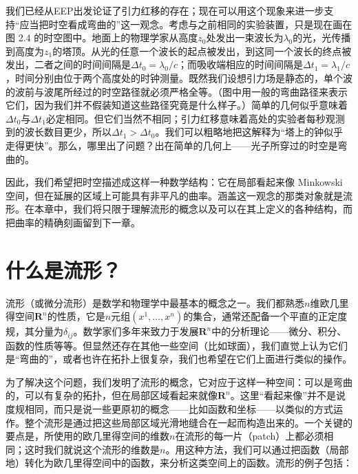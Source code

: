 我们已经从EEP出发论证了引力红移的存在；现在可以用这个现象来进一步支持“应当把时空看成弯曲的”这一观念。考虑与之前相同的实验装置，只是现在画在图 2.4 的时空图中。地面上的物理学家从高度$z_0$处发出一束波长为$\lambda_0$的光，光传播到高度为$z_1$的塔顶。从光的任意一个波长的起点被发出，到这同一个波长的终点被发出，二者之间的时间间隔是$\Delta t_0 = \lambda_0/c$；而吸收端相应的时间间隔是$\Delta t_1 = \lambda_1/c$，时间分别由位于两个高度处的时钟测量。既然我们设想引力场是静态的，单个波的波前与波尾所经过的时空路径就必须严格全等。（图中用一般的弯曲路径来表示它们，因为我们并不假装知道这些路径究竟是什么样子。）简单的几何似乎意味着$\Delta t_0$与$\Delta t_1$必定相同。但它们当然不相同；引力红移意味着高处的实验者每秒观测到的波长数目更少，所以$\Delta t_1 > \Delta t_0$。我们可以粗略地把这解释为“塔上的钟似乎走得更快”。那么，哪里出了问题？出在简单的几何上——光子所穿过的时空是弯曲的。


因此，我们希望把时空描述成这样一种数学结构：它在局部看起来像 Minkowski 空间，但在延展的区域上可能具有非平凡的曲率。涵盖这一观念的那类对象就是流形。在本章中，我们将只限于理解流形的概念以及可以在其上定义的各种结构，而把曲率的精确刻画留到下一章。

\section{什么是流形？}

流形（或微分流形）是数学和物理学中最基本的概念之一。我们都熟悉$n$维欧几里得空间$\mathbf{R}^n$的性质，它是$n$元组$(x^1,\ldots,x^n)$的集合，通常还配备一个平直的正定度规，其分量为$\delta_{ij}$。数学家们多年来致力于发展$\mathbf{R}^n$中的分析理论——微分、积分、函数的性质等等。但显然还存在其他一些空间（比如球面），我们直觉上认为它们是“弯曲的”，或者也许在拓扑上很复杂，我们也希望在它们上面进行类似的操作。

为了解决这个问题，我们发明了流形的概念，它对应于这样一种空间：可以是弯曲的，可以有复杂的拓扑，但在局部区域看起来就像$\mathbf{R}^n$。这里“看起来像”并不是说度规相同，而只是说一些更原初的概念——比如函数和坐标——以类似的方式运作。整个流形是通过把这些局部区域光滑地缝合在一起而构造出来的。一个关键的要点是，所使用的欧几里得空间的维数$n$在流形的每一片（patch）上都必须相同；这时我们就说这个流形的维数是$n$。用这种方法，我们可以通过把函数（局部地）转化为欧几里得空间中的函数，来分析这类空间上的函数。流形的例子包括：

